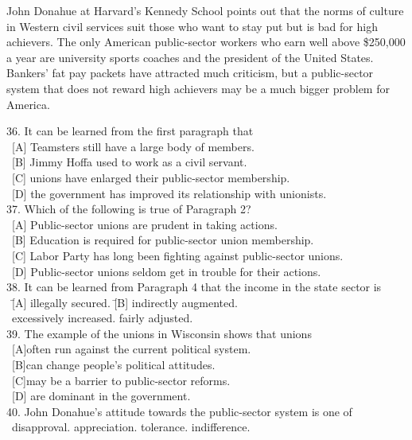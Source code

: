 John Donahue at Harvard’s Kennedy School points out that the norms of culture in Western 
civil services suit those who want to stay put but is bad for high achievers. The only 
American public-sector workers who earn well above \$250,000 a year are university sports 
coaches and the president of the United States. Bankers’ fat pay packets have attracted 
much criticism, but a public-sector system that does not reward high achievers may be a 
much bigger problem for America.

\begin{tabbing}
36. It can be learned from the first paragraph that\\
\ [A] Teamsters still have a large body of members.\\
\ [B] Jimmy Hoffa used to work as a civil servant.\\
\ [C] unions have enlarged their public-sector membership.\\
\ [D] the government has improved its relationship with unionists.\\
37. Which of the following is true of Paragraph 2?\\
\ [A] Public-sector unions are prudent in taking actions.\\
\ [B] Education is required for public-sector union membership.\\
\ [C] Labor Party has long been fighting against public-sector unions.\\
\ [D] Public-sector unions seldom get in trouble for their actions.\\
38. It can be learned from Paragraph 4 that the income in the state sector is\\
\ \= [A] illegally secured. \quad\quad\quad\quad\quad\quad\quad\quad\= [B] indirectly augmented.\\
\ \> [C] excessively increased. \> [D] fairly adjusted.\\
39. The example of the unions in Wisconsin shows that unions\\
\ [A]often run against the current political system.\\
\ [B]can change people’s political attitudes.\\
\ [C]may be a barrier to public-sector reforms.\\
\ [D] are dominant in the government.\\
40. John Donahue’s attitude towards the public-sector system is one of\\
\ \> [A] disapproval. \quad [B] appreciation. \> [C] tolerance. \quad [D] indifference. 
\end{tabbing}
